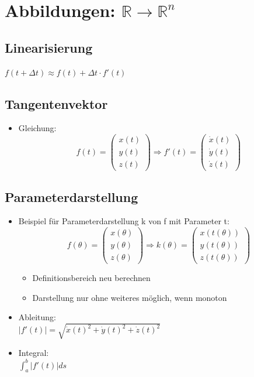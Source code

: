 \section{Abbildungen: $\mathbb{R} \rightarrow \mathbb{R}^n$}

\subsection{Linearisierung}
$f(t+\Delta t) \approx f(t) + \Delta t \cdot f'(t)$

\subsection{Tangentenvektor}
\begin{itemize}
	\item Gleichung: \\
	\begin{displaymath}
		f(t) = 
		\begin{pmatrix}
			x(t) \\ y(t) \\ z(t)
		\end{pmatrix}
		\Rightarrow
		f'(t) =
		\begin{pmatrix}
			\dot{x}(t) \\ \dot{y}(t) \\ \dot{z}(t)
		\end{pmatrix}
	\end{displaymath}
\end{itemize}

\subsection{Parameterdarstellung}
\begin{itemize}
	\item Beispiel für Parameterdarstellung k von f mit Parameter t:
	\begin{displaymath}
		f(\theta) =
		\begin{pmatrix}
			x(\theta) \\ y(\theta) \\ z(\theta)
		\end{pmatrix}
		\Rightarrow
		k(\theta) =
		\begin{pmatrix}
			x(t(\theta)) \\ y(t(\theta)) \\ z(t(\theta))
		\end{pmatrix}
	\end{displaymath}
	\begin{itemize}
		\item Definitionsbereich neu berechnen
		\item Darstellung nur ohne weiteres möglich, wenn monoton
	\end{itemize}
	\item Ableitung: \\
	$|f'(t)| = \sqrt{\dot{x}(t)^2 + \dot{y}(t)^2 + \dot{z}(t)^2}$
	\item Integral: \\
	$\int_a^b |f'(t)| ds$
\end{itemize}

